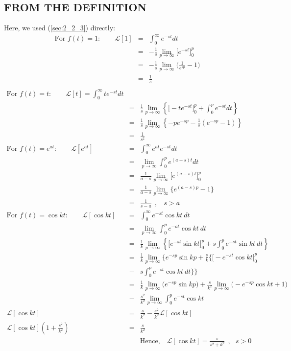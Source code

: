\documentclass[11pt]{report}
\newcommand{\Laplace}{\mathcal{L}}
\newcommand{\ft}{f(t)}
\newcommand{\sbracket}[1]{\left[#1\right]}
\newcommand{\LFn}[1]{\Laplace \sbracket{#1}}
\newcommand{\sps}{\\[0.2cm]}
\newcommand{\spn}[1]{\\[#1cm]}
\newcommand{\dsp}{\displaystyle}
\begin{document}
	\subsection{FROM THE DEFINITION}
	Here, we used (\ref{sec:2_2_3}) directly:
	\begin{eqnarray*}
		\text{For } \ft = 1:\qquad  \dsp\LFn{1} &=& \int_0^\infty e^{-st}dt \\
		&=& -\dsp\frac{1}{s}\lim\limits_{p\rightarrow\infty}\Big[e^{-st}\Big]_0^p\\
		&=&-\dsp\frac{1}{s}\lim\limits_{p\rightarrow\infty}\Big(\dsp\frac{1}{e^{sp}}-1\Big)\\
		&=& \dsp \frac{1}{s}\sps
	\end{eqnarray*}
	\begin{eqnarray*}
		\text{For } \ft = t:\qquad  \dsp\LFn{t} =\int_0^\infty te^{-st}dt\\
		&=& \dsp\frac{1}{s}\lim\limits_{p\rightarrow\infty}\left\{ \Big[-te^{-st}\Big]_0^p + \int_0^pe^{-st}dt\right\}\\
		&=&\dsp\frac{1}{s}\lim\limits_{p\rightarrow\infty}\left\{ -pe^{-sp} - \frac{1}{s}\left(e^{-sp} - 1\right)    \right\}\\
		&=&\dsp\frac{1}{s^2}\spn{.6}
		\text{For } \ft = \dsp e^{at}:\qquad  \dsp\LFn{e^{at}} &=& \int_0^\infty e^{at}e^{-st}dt\\
		&=& \lim\limits_{p\rightarrow\infty}\int_0^p e^{(a-s)t}dt\\
		&=&\frac{1}{a-s}\lim\limits_{p\rightarrow\infty}\Big[e^{(a-s)t}\Big]_0^p\\
		&=&\frac{1}{a-s}\lim\limits_{p\rightarrow\infty}\Big\{e^{(a-s)p}-1\Big\}\\
		&=& \frac{1}{s-a}~~, ~~~~ s > a\spn{.6}
		\text{For } \ft = \dsp \cos kt:\qquad  \dsp\LFn{\cos kt} &=& \int_0^\infty e^{-st}\cos kt~dt\\
		&=&\lim\limits_{p\rightarrow\infty}\int_0^p e^{-at}\cos kt~dt\\
		&=& \frac{1}{k}\lim\limits_{p\rightarrow\infty}\left\{ \Big[e^{-st}\sin kt\Big]_0^p + s\int_0^p e^{-st}\sin kt~dt \right\}\\
		&=& \frac{1}{k}\lim\limits_{p\rightarrow\infty}\Big\{ e^{-sp}\sin kp + \frac{s}{k}\Big\{ \Big[-e^{-st}\cos kt\Big]_0^p\\ &-& s\int_0^p e^{-st}\cos kt~ dt \Big\}  \Big\}\\
		&=&\frac{1}{k}\lim\limits_{p\rightarrow\infty}\Big(e^{-sp}\sin kp \Big) + \frac{s}{k^2}\lim\limits_{p\rightarrow\infty}\Big(-e^{-sp}\cos kt + 1\Big)\\ &-& \frac{s^2}{k^2}\lim\limits_{p\rightarrow\infty}\int_0^p e^{-st}\cos kt\\
		\Laplace[\cos kt]&=&\frac{s}{k^2}-\frac{s^2}{k^2}\Laplace[\cos kt]\\
		\Laplace[\cos kt]\left(1 + \frac{s^2}{k^2}\right) &=& \frac{s}{k^2}\\
		&&\text{Hence, }~~~ \LFn{\cos kt} = \frac{s}{s^2 + k^2}~~, ~~~ s > 0
	\end{eqnarray*}
	
\end{document}
